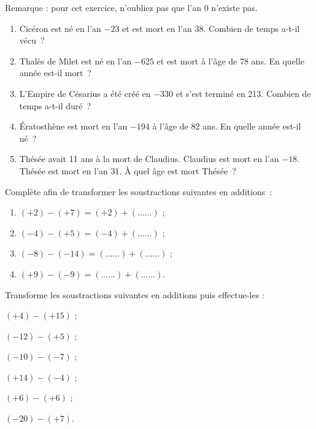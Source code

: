 \begin{exercice}
Remarque : pour cet exercice, n'oubliez pas que l'an 0 n'existe pas.
\begin{enumerate}
 \item Cicéron est né en l'an $-23$ et est mort en l'an 38. Combien de temps a-t-il vécu ?
 \item Thalès de Milet est né en l'an $-625$ et est mort à l'âge de 78 ans. En quelle année est-il mort ?
 \item L'Empire de Césarius a été créé en $-330$ et s'est terminé en 213. Combien de temps a-t-il duré ?
 \item Ératosthène est mort en l'an $-194$ à l'âge de 82 ans. En quelle année est-il né ?
 \item Thésée avait 11 ans à la mort de Claudius. Claudius est mort en l'an $-18$. Thésée est mort en l'an 31. À quel âge est mort Thésée ?
 \end{enumerate}
\end{exercice}


\newpage


\begin{exercice}
Complète afin de transformer les soustractions suivantes en additions :
\begin{enumerate}
 \item $(+2) - (+7) = (+2) + (\ldots \ldots)$ ;
 \item $(-4) - (+5) = (-4) + (\ldots \ldots)$ ;
 \item $(-8) - (-14) =  (\ldots \ldots) + (\ldots \ldots)$ ;
 \item $(+9) - (-9) =  (\ldots \ldots) + (\ldots \ldots)$.
 \end{enumerate}
\end{exercice}

\begin{exercice}
Transforme les soustractions suivantes en additions puis effectue-les :
\begin{colenumerate}{1}
 \item $(+4) - (+15)$ \dotfill;
 \vspace{0.4em}
 \item $(-12) - (+5)$ \dotfill;
 \vspace{0.4em}
 \item $(-10) - (-7)$ \dotfill;
 \vspace{0.4em}
 \item $(+14) - (-4)$ \dotfill;
 \vspace{0.4em}
 \item $(+6) - (+6)$ \dotfill;
 \vspace{0.4em}
 \item $(-20) - (+7)$\dotfill.
 \end{colenumerate}
\end{exercice}


